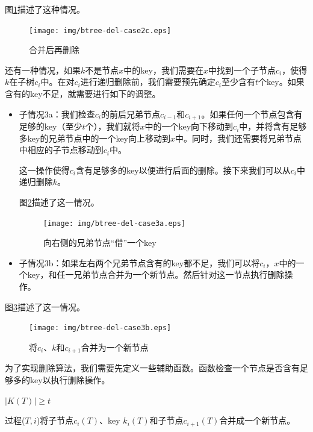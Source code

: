\documentclass{ctexart}
\begin{document}
图\ref{fig:btree-del-case2c}描述了这种情况。

\begin{figure}[htbp]
  \centering
    \texttt{[image: img/btree-del-case2c.eps]}
    \caption{合并后再删除} \label{fig:btree-del-case2c}
\end{figure}

还有一种情况，如果$k$不是节点$x$中的key，我们需要在$x$中找到一个子节点$c_i$，使得$k$在子树$c_i$中。在对$c_i$进行递归删除前，我们需要预先确定$c_i$至少含有$t$个key。如果含有的key不足，就需要进行如下的调整。

\begin{itemize}
\item 子情况3a：我们检查$c_i$的前后兄弟节点$c_{i-1}$和$c_{i+1}$。如果任何一个节点包含有足够的key（至少$t$个），我们就将$x$中的一个key向下移动到$c_i$中，并将含有足够多key的兄弟节点中的一个key向上移动到$x$中。同时，我们还需要将兄弟节点中相应的子节点移动到$c_i$中。

这一操作使得$c_i$含有足够多的key以便进行后面的删除。接下来我们可以从$c_i$中递归删除$k$。

图\ref{fig:btree-del-case3a}描述了这一情况。

\begin{figure}[htbp]
  \centering
    \texttt{[image: img/btree-del-case3a.eps]}
    \caption{向右侧的兄弟节点“借”一个key}
    \label{fig:btree-del-case3a}
\end{figure}

\item 子情况3b：如果左右两个兄弟节点含有的key都不足，我们可以将$c_i$，$x$中的一个key，和任一兄弟节点合并为一个新节点。然后针对这一节点执行删除操作。
\end{itemize}

图\ref{fig:btree-del-case3b}描述了这一情况。

\begin{figure}[htbp]
  \centering
    \texttt{[image: img/btree-del-case3b.eps]}
    \caption{将$c_i$、$k$和$c_{i+1}$合并为一个新节点}
    \label{fig:btree-del-case3b}
\end{figure}

为了实现删除算法，我们需要先定义一些辅助函数。函数检查一个节点是否含有足够多的key以执行删除操作。

\begin{algorithmic}[1]
  \State \Return $|K(T)| \ge t$
\EndFunction
\end{algorithmic}

过程($T, i$)将子节点$c_i(T)$、key $k_i(T)$和子节点$c_{i+1}(T)$合并成一个新节点。
\end{document}
